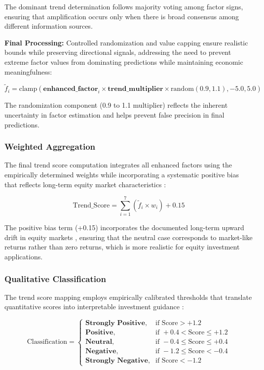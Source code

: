 \documentclass[3p,times,procedia]{elsarticle}
\begin{document}
The dominant trend determination follows majority voting among factor signs, ensuring that amplification occurs only when there is broad consensus among different information sources.

\textbf{Final Processing:}
Controlled randomization and value capping ensure realistic bounds while preserving directional signals, addressing the need to prevent extreme factor values from dominating predictions while maintaining economic meaningfulness:

\begin{equation}
\tilde{f}_i = \text{clamp}\left(\textbf{enhanced\_factor}_i \times \textbf{trend\_multiplier} \times \text{random}(0.9, 1.1), -5.0, 5.0\right)
\end{equation}

The randomization component (0.9 to 1.1 multiplier) reflects the inherent uncertainty in factor estimation and helps prevent false precision in final predictions.

\subsubsection{{Weighted Aggregation}}

The final trend score computation integrates all enhanced factors using the empirically determined weights while incorporating a systematic positive bias that reflects long-term equity market characteristics \cite{Fama1965}:

\begin{equation}
\text{Trend\_Score} = \sum_{i=1}^{7} \left(\tilde{f}_i \times w_i\right) + 0.15
\end{equation}

The positive bias term (+0.15) incorporates the documented long-term upward drift in equity markets \cite{Fama1965}, ensuring that the neutral case corresponds to market-like returns rather than zero returns, which is more realistic for equity investment applications.

\subsubsection{{Qualitative Classification}}

The trend score mapping employs empirically calibrated thresholds that translate quantitative scores into interpretable investment guidance \cite{Ribeiro2016}:

\begin{equation}
\text{Classification} = 
\begin{cases} 
\textbf{Strongly Positive}, & \text{if Score} > +1.2 \\
\textbf{Positive}, & \text{if } +0.4 < \text{Score} \leq +1.2 \\
\textbf{Neutral}, & \text{if } -0.4 \leq \text{Score} \leq +0.4 \\
\textbf{Negative}, & \text{if } -1.2 \leq \text{Score} < -0.4 \\
\textbf{Strongly Negative}, & \text{if Score} < -1.2
\end{cases}
\end{equation}
\end{document}
